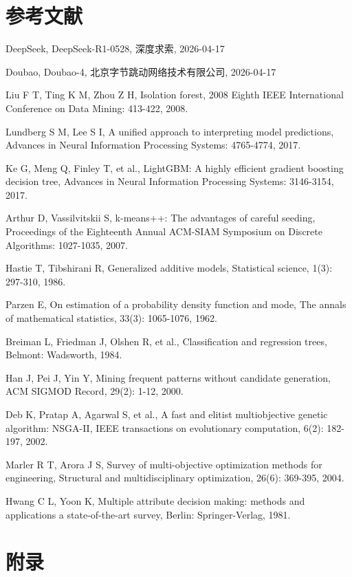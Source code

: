 \documentclass[12pt]{article}
\begin{document}
	\section{参考文献}
	\begin{enumerate}[label={[\arabic*]}]
		\item DeepSeek, DeepSeek-R1-0528, 深度求索, 2026-04-17
		\item Doubao, Doubao-4, 北京字节跳动网络技术有限公司, 2026-04-17
		\item Liu F T, Ting K M, Zhou Z H, Isolation forest, 2008 Eighth IEEE International Conference on Data Mining: 413-422, 2008.
		\item Lundberg S M, Lee S I, A unified approach to interpreting model predictions, Advances in Neural Information Processing Systems: 4765-4774, 2017.
		\item Ke G, Meng Q, Finley T, et al., LightGBM: A highly efficient gradient boosting decision tree, Advances in Neural Information Processing Systems: 3146-3154, 2017.
		\item Arthur D, Vassilvitskii S, k-means++: The advantages of careful seeding, Proceedings of the Eighteenth Annual ACM-SIAM Symposium on Discrete Algorithms: 1027-1035, 2007.
		\item Hastie T, Tibshirani R, Generalized additive models, Statistical science, 1(3): 297-310, 1986.
		\item Parzen E, On estimation of a probability density function and mode, The annals of mathematical statistics, 33(3): 1065-1076, 1962.
		\item Breiman L, Friedman J, Olshen R, et al., Classification and regression trees, Belmont: Wadsworth, 1984.
		\item Han J, Pei J, Yin Y, Mining frequent patterns without candidate generation, ACM SIGMOD Record, 29(2): 1-12, 2000.
		\item Deb K, Pratap A, Agarwal S, et al., A fast and elitist multiobjective genetic algorithm: NSGA-II, IEEE transactions on evolutionary computation, 6(2): 182-197, 2002.
		\item Marler R T, Arora J S, Survey of multi-objective optimization methods for engineering, Structural and multidisciplinary optimization, 26(6): 369-395, 2004.
		\item Hwang C L, Yoon K, Multiple attribute decision making: methods and applications a state-of-the-art survey, Berlin: Springer-Verlag, 1981.
	\end{enumerate}	

\section{附录}
\end{document}
